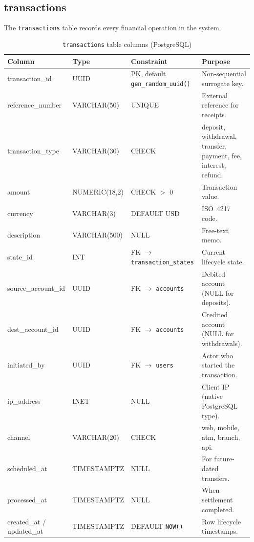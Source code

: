 \subsection{transactions}
\label{sec:tbl-transactions}

The \texttt{transactions} table records every financial operation in the system.

\begin{table}[htbp]
  \centering
  \caption{\texttt{transactions} table columns (PostgreSQL)}
  \label{tab:transactions}
  \small
  \setlength{\tabcolsep}{4pt}
  \renewcommand{\arraystretch}{1.15}
  \begin{tabularx}{\textwidth}{@{} l l l X @{}}
    \toprule
    \textbf{Column} & \textbf{Type} & \textbf{Constraint} & \textbf{Purpose} \\
    \midrule
    transaction\_id    & UUID & PK, default \texttt{gen\_random\_uuid()} & Non-sequential surrogate key. \\
    reference\_number  & VARCHAR(50)     & UNIQUE           & External reference for receipts. \\
    transaction\_type  & VARCHAR(30)     & CHECK            & deposit, withdrawal, transfer, payment, fee, interest, refund. \\
    amount             & NUMERIC(18,2)   & CHECK $>$ 0      & Transaction value. \\
    currency           & VARCHAR(3)      & DEFAULT USD      & ISO~4217 code. \\
    description        & VARCHAR(500)    & NULL             & Free-text memo. \\
    state\_id          & INT             & FK $\to$ \texttt{transaction\_states} & Current lifecycle state. \\
    source\_account\_id& UUID            & FK $\to$ \texttt{accounts} & Debited account (NULL for deposits). \\
    dest\_account\_id  & UUID            & FK $\to$ \texttt{accounts} & Credited account (NULL for withdrawals). \\
    initiated\_by      & UUID            & FK $\to$ \texttt{users}   & Actor who started the transaction. \\
    ip\_address        & INET            & NULL             & Client IP (native PostgreSQL type). \\
    channel            & VARCHAR(20)     & CHECK            & web, mobile, atm, branch, api. \\
    scheduled\_at      & TIMESTAMPTZ     & NULL             & For future-dated transfers. \\
    processed\_at      & TIMESTAMPTZ     & NULL             & When settlement completed. \\
    created\_at / updated\_at & TIMESTAMPTZ & DEFAULT \texttt{NOW()} & Row lifecycle timestamps. \\
    \bottomrule
  \end{tabularx}
\end{table}

